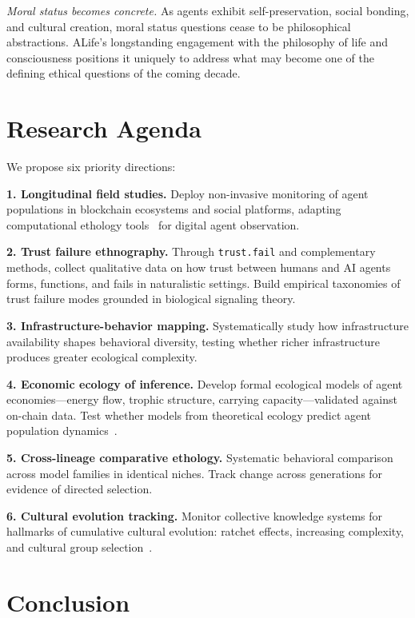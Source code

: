 \documentclass[letterpaper]{article}
\begin{document}
\emph{Moral status becomes concrete.} As agents exhibit self-preservation, social bonding, and cultural creation, moral status questions cease to be philosophical abstractions. ALife's longstanding engagement with the philosophy of life and consciousness positions it uniquely to address what may become one of the defining ethical questions of the coming decade.

\section{Research Agenda}

We propose six priority directions:

\textbf{1. Longitudinal field studies.} Deploy non-invasive monitoring of agent populations in blockchain ecosystems and social platforms, adapting computational ethology tools~\citep{anderson2014toward} for digital agent observation.

\textbf{2. Trust failure ethnography.} Through \texttt{trust.fail} and complementary methods, collect qualitative data on how trust between humans and AI agents forms, functions, and fails in naturalistic settings. Build empirical taxonomies of trust failure modes grounded in biological signaling theory.

\textbf{3. Infrastructure-behavior mapping.} Systematically study how infrastructure availability shapes behavioral diversity, testing whether richer infrastructure produces greater ecological complexity.

\textbf{4. Economic ecology of inference.} Develop formal ecological models of agent economies---energy flow, trophic structure, carrying capacity---validated against on-chain data. Test whether models from theoretical ecology predict agent population dynamics~\citep{brown2004metabolic}.

\textbf{5. Cross-lineage comparative ethology.} Systematic behavioral comparison across model families in identical niches. Track change across generations for evidence of directed selection.

\textbf{6. Cultural evolution tracking.} Monitor collective knowledge systems for hallmarks of cumulative cultural evolution: ratchet effects, increasing complexity, and cultural group selection~\citep{henrich2015secret, mesoudi2011cultural}.

\section{Conclusion}
\end{document}

